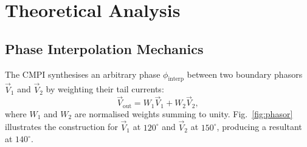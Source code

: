 \section{Theoretical Analysis}
\label{sec:analysis}

\subsection{Phase Interpolation Mechanics}

The CMPI synthesises an arbitrary phase $\phi_\mathrm{interp}$ between two
boundary phasors $\vec{V}_1$ and $\vec{V}_2$ by weighting their tail currents:
\begin{equation}
    \vec{V}_\mathrm{out} = W_1 \vec{V}_1 + W_2 \vec{V}_2,
    \label{eq:interp}
\end{equation}
where $W_1$ and $W_2$ are normalised weights summing to unity.
Fig.~\ref{fig:phasor} illustrates the construction for $\vec{V}_1$ at
$120^\circ$ and $\vec{V}_2$ at $150^\circ$, producing a resultant at
$140^\circ$.

